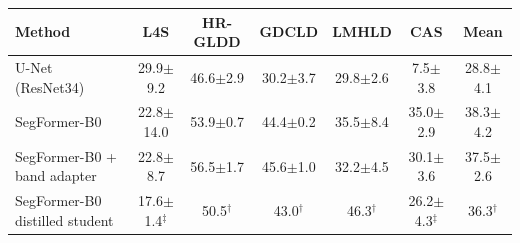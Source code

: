 \begin{tabular}{lcccccc}
\toprule
Method & L4S & HR-GLDD & GDCLD & LMHLD & CAS & Mean \\
\midrule
U-Net (ResNet34) & 29.9$\pm$9.2 & 46.6$\pm$2.9 & 30.2$\pm$3.7 & 29.8$\pm$2.6 & 7.5$\pm$3.8 & 28.8$\pm$4.1 \\
SegFormer-B0 & 22.8$\pm$14.0 & 53.9$\pm$0.7 & 44.4$\pm$0.2 & 35.5$\pm$8.4 & 35.0$\pm$2.9 & 38.3$\pm$4.2 \\
SegFormer-B0 + band adapter & 22.8$\pm$8.7 & 56.5$\pm$1.7 & 45.6$\pm$1.0 & 32.2$\pm$4.5 & 30.1$\pm$3.6 & 37.5$\pm$2.6 \\
SegFormer-B0 distilled student & 17.6$\pm$1.4$^\ddagger$ & 50.5$^\dagger$ & 43.0$^\dagger$ & 46.3$^\dagger$ & 26.2$\pm$4.3$^\ddagger$ & 36.3$^\dagger$ \\
\bottomrule
\end{tabular}

